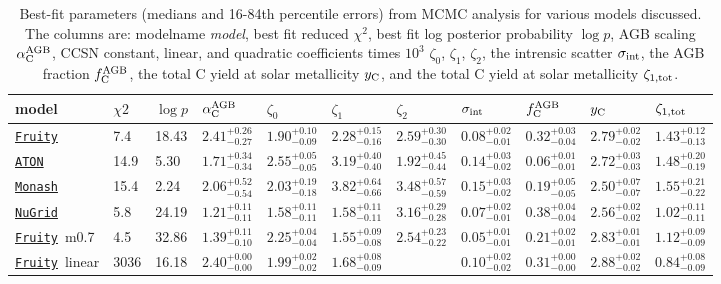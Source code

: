 \documentclass[fleqn,
usenatbib]{mnras}
\newcommand{\fruity}{\texttt{\hyperlink{fruity}{Fruity}}}
\newcommand{\nugrid}{\texttt{\hyperlink{nugrid}{NuGrid}}}
\newcommand{\monash}{\texttt{\hyperlink{monash}{Monash}}}
\newcommand{\aton}{\texttt{\hyperlink{aton}{ATON}}}
\newcommand{\Yct}{{y_{\rm C}}}
\newcommand{\aagb}{\alpha_{\rm C}^{\rm AGB}}
\newcommand{\fagb}{f_{\rm C}^{\rm AGB}}
\newcommand{\zetao}{\zeta_0}
\newcommand{\zetai}{\zeta_{1}}
\newcommand{\zetaii}{\zeta_{2}}
\begin{document}
\begin{table}
    \caption{
        Best-fit parameters (medians and 16-84th percentile errors) from MCMC analysis for various models discussed.
        The columns are:  modelname \textit{model}, best fit reduced $\chi^2$, best fit log posterior probability $\log p$, AGB scaling $\aagb$, CCSN constant, linear, and quadratic coefficients times $10^3$ $\zetao$, $\zetai$, $\zetaii$, the intrensic scatter $\sigma_{\rm int}$, the AGB fraction $\fagb$, the total C yield at solar metallicity $\Yct$, and the total C yield at solar metallicity $\zeta_{\rm 1, tot}$.
    }
    \label{tab:mcmc_results}

{ 
\renewcommand{\baselinestretch}{1.2}
    \begin{tabular}{l l l l l l l l l l l} 
    \hline
    model            & $\chi2$  & $\log p$ & $\aagb$ & $\zetao$ & $\zetai$ & $\zetaii$ & $\sigma_{\rm int}$ & $\fagb$ & $\Yct$ & $\zeta_{\rm 1, tot}$\\
\hline
\fruity          &      7.4 &    18.43 & $2.41^{+0.26}_{-0.27}$  &  $1.90^{+0.10}_{-0.09}$  &  $2.28^{+0.15}_{-0.16}$  &  $2.59^{+0.30}_{-0.30}$  &  $0.08^{+0.02}_{-0.01}$  &  $0.32^{+0.03}_{-0.04}$  &  $2.79^{+0.02}_{-0.02}$  &  $1.43^{+0.12}_{-0.13}$\\ 
\aton            &     14.9 &     5.30 & $1.71^{+0.34}_{-0.34}$  &  $2.55^{+0.05}_{-0.05}$  &  $3.19^{+0.40}_{-0.40}$  &  $1.92^{+0.45}_{-0.44}$  &  $0.14^{+0.03}_{-0.02}$  &  $0.06^{+0.01}_{-0.01}$  &  $2.72^{+0.03}_{-0.03}$  &  $1.48^{+0.20}_{-0.19}$\\ 
\monash          &     15.4 &     2.24 & $2.06^{+0.52}_{-0.54}$  &  $2.03^{+0.19}_{-0.18}$  &  $3.82^{+0.64}_{-0.66}$  &  $3.48^{+0.57}_{-0.59}$  &  $0.15^{+0.03}_{-0.02}$  &  $0.19^{+0.05}_{-0.05}$  &  $2.50^{+0.07}_{-0.07}$  &  $1.55^{+0.21}_{-0.22}$\\ 
\nugrid          &      5.8 &    24.19 & $1.21^{+0.11}_{-0.11}$  &  $1.58^{+0.11}_{-0.11}$  &  $1.58^{+0.11}_{-0.11}$  &  $3.16^{+0.29}_{-0.28}$  &  $0.07^{+0.02}_{-0.01}$  &  $0.38^{+0.04}_{-0.04}$  &  $2.56^{+0.02}_{-0.02}$  &  $1.02^{+0.11}_{-0.11}$\\ 
\fruity\ m0.7    &      4.5 &    32.86 & $1.39^{+0.11}_{-0.10}$  &  $2.25^{+0.04}_{-0.04}$  &  $1.55^{+0.09}_{-0.08}$  &  $2.54^{+0.23}_{-0.22}$  &  $0.05^{+0.01}_{-0.01}$  &  $0.21^{+0.02}_{-0.01}$  &  $2.83^{+0.01}_{-0.01}$  &  $1.12^{+0.09}_{-0.09}$\\ 
\fruity\ linear  &   3036 &    16.18 & $2.40^{+0.00}_{-0.00}$  &  $1.99^{+0.02}_{-0.02}$  &  $1.68^{+0.08}_{-0.09}$  &     &  $0.10^{+0.02}_{-0.02}$  &  $0.31^{+0.00}_{-0.00}$  &  $2.88^{+0.02}_{-0.02}$  &  $0.84^{+0.08}_{-0.09}$\\ 

\end{tabular}}
\end{table}
\end{document}

